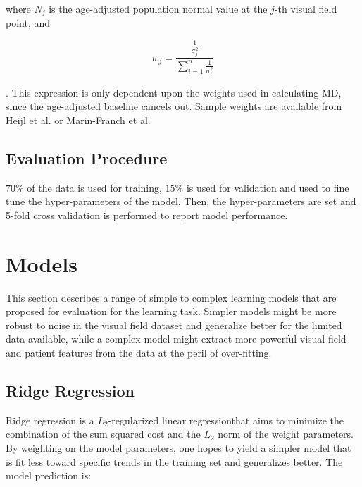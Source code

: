 where $N_j$ is the age-adjusted population normal value at the $j$-th visual field point, and 

\begin{equation}
w_j=\frac{ \frac{1}{\sigma_{j}^2} }{
	\sum\limits_{i=1}^{n} 
	\frac{1}{\sigma_{i}^2} 
}
\end{equation}

. This expression is only dependent upon the weights used in calculating \ac{MD}, since the age-adjusted baseline cancels out. Sample weights are available from Heijl et al. \cite{Heijl1987} or Marin-Franch et al. \cite{Marin-Franch2013}

\subsection{Evaluation Procedure}

$70\%$ of the data is used for training, $15\%$ is used for validation and used to fine tune the hyper-parameters of the model. Then, the hyper-parameters are set and 5-fold cross validation is performed to report model performance. 

\section{Models}

This section describes a range of simple to complex learning models that are proposed for evaluation for the learning task. Simpler models might be more robust to noise in the visual field dataset and generalize better for the limited data available, while a complex model might extract more powerful visual field and patient features from the data at the peril of over-fitting. 

\subsection{Ridge Regression}

Ridge regression is a $L_2$-regularized linear regression\footnotemark that aims to minimize the combination of the sum squared cost and the $L_2$ norm of the weight parameters. By weighting on the model parameters, one hopes to yield a simpler model that is fit less toward specific trends in the training set and generalizes better. The model prediction is: 


